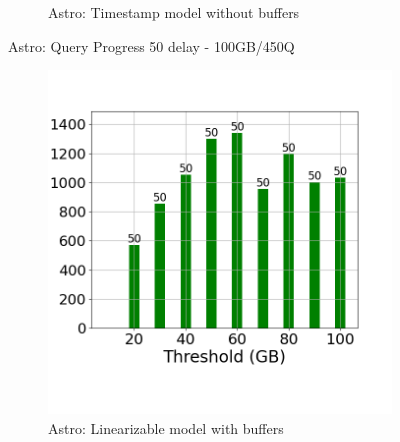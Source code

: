 \begin{figure}
\begin{subfigure}[c]{0.48\textwidth}
		\caption{Astro: Timestamp model without buffers}
		\label{fig:system-ts-no-50-astro}
	\end{subfigure}
	\caption{Astro: Query Progress 50 delay - 100GB/450Q}
	\label{fig:query-progress-50-astro}
\end{figure}
\begin{figure}
	\centering
	\begin{subfigure}[c]{0.48\textwidth}
		\includegraphics[width=1\textwidth]   {figures/Experiments/Dynamic/ASTRO/Batch_processing/60/average_query_time_per_batch_version_999777015_10485760_10_delay[60].png}
		\caption{Astro: Linearizable model with buffers}
		\label{fig:logical-ts-60-astro}
	\end{subfigure}
	\begin{subfigure}[c]{0.48\textwidth}

\end{subfigure}
\end{figure}
